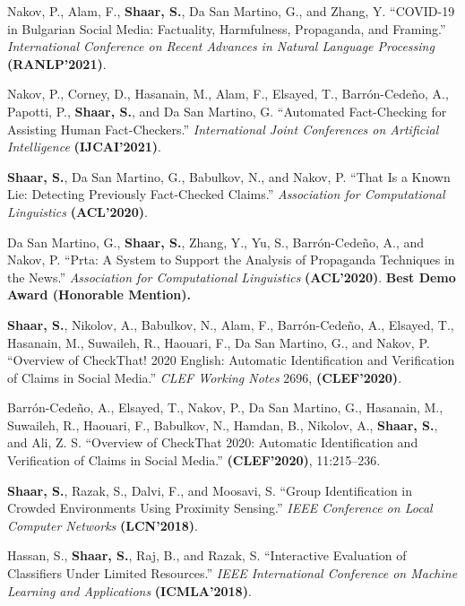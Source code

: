 \begin{publist}
  \item Nakov, P., Alam, F., \textbf{Shaar, S.}, Da San Martino, G., and Zhang, Y. ``COVID-19 in Bulgarian Social Media: Factuality, Harmfulness, Propaganda, and Framing.'' \textit{International Conference on Recent Advances in Natural Language Processing} \textbf{(RANLP'2021)}.

  \item Nakov, P., Corney, D., Hasanain, M., Alam, F., Elsayed, T., Barr\'on-Cede\~no, A., Papotti, P., \textbf{Shaar, S.}, and Da San Martino, G. ``Automated Fact-Checking for Assisting Human Fact-Checkers.'' \textit{International Joint Conferences on Artificial Intelligence} \textbf{(IJCAI'2021)}.

  \item \textbf{Shaar, S.}, Da San Martino, G., Babulkov, N., and Nakov, P. ``That Is a Known Lie: Detecting Previously Fact-Checked Claims.'' \textit{Association for Computational Linguistics} \textbf{(ACL'2020)}.

  \item Da San Martino, G., \textbf{Shaar, S.}, Zhang, Y., Yu, S., Barr\'on-Cede\~no, A., and Nakov, P. ``Prta: A System to Support the Analysis of Propaganda Techniques in the News.'' \textit{Association for Computational Linguistics} \textbf{(ACL'2020)}. \textbf{Best Demo Award (Honorable Mention).}

  \item \textbf{Shaar, S.}, Nikolov, A., Babulkov, N., Alam, F., Barr\'on-Cede\~no, A., Elsayed, T., Hasanain, M., Suwaileh, R., Haouari, F., Da San Martino, G., and Nakov, P. ``Overview of CheckThat! 2020 English: Automatic Identification and Verification of Claims in Social Media.'' \textit{CLEF Working Notes} 2696, \textbf{(CLEF'2020)}.

  \item Barr\'on-Cede\~no, A., Elsayed, T., Nakov, P., Da San Martino, G., Hasanain, M., Suwaileh, R., Haouari, F., Babulkov, N., Hamdan, B., Nikolov, A., \textbf{Shaar, S.}, and Ali, Z. S. ``Overview of CheckThat 2020: Automatic Identification and Verification of Claims in Social Media.'' \textbf{(CLEF'2020)}, 11:215--236.

  \item \textbf{Shaar, S.}, Razak, S., Dalvi, F., and Moosavi, S. ``Group Identification in Crowded Environments Using Proximity Sensing.'' \textit{IEEE Conference on Local Computer Networks} \textbf{(LCN'2018)}.

  \item Hassan, S., \textbf{Shaar, S.}, Raj, B., and Razak, S. ``Interactive Evaluation of Classifiers Under Limited Resources.'' \textit{IEEE International Conference on Machine Learning and Applications} \textbf{(ICMLA'2018)}.
\end{publist}
